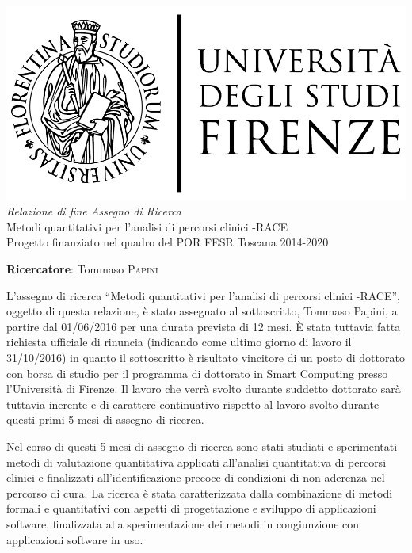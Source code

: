 \documentclass{article}
\begin{document}
    
    \begin{center}
        \includegraphics[scale=0.2]{logo_unifi.jpg}\\[4cm]
        \textit{Relazione di fine Assegno di Ricerca}\\[0.3cm]
        {\Huge Metodi quantitativi per l'analisi di percorsi clinici -RACE}\\[0.2cm]
        Progetto finanziato nel quadro del POR FESR Toscana 2014-2020
    \end{center}
    
    \vfill
    
    \textbf{Ricercatore}: Tommaso \textsc{Papini}
    
    \clearpage
    
    L'assegno di ricerca ``Metodi quantitativi per l'analisi di percorsi clinici -RACE'', oggetto di questa relazione, è stato assegnato al sottoscritto, Tommaso Papini, a partire dal 01/06/2016 per una durata prevista di 12 mesi. È stata tuttavia fatta richiesta ufficiale di rinuncia (indicando come ultimo giorno di lavoro il 31/10/2016) in quanto il sottoscritto è risultato vincitore di un posto di dottorato con borsa di studio per il programma di dottorato in Smart Computing presso l'Università di Firenze. Il lavoro che verrà svolto durante suddetto dottorato sarà tuttavia inerente e di carattere continuativo rispetto al lavoro svolto durante questi primi 5 mesi di assegno di ricerca.
    
    Nel corso di questi 5 mesi di assegno di ricerca sono stati studiati e sperimentati metodi di valutazione quantitativa applicati all'analisi quantitativa di percorsi clinici e finalizzati all'identificazione precoce di condizioni di non aderenza nel percorso di cura. La ricerca è stata caratterizzata dalla combinazione di metodi formali e quantitativi con aspetti di progettazione e sviluppo di applicazioni software, finalizzata alla sperimentazione dei metodi in congiunzione con applicazioni software in uso.
    
\end{document}
